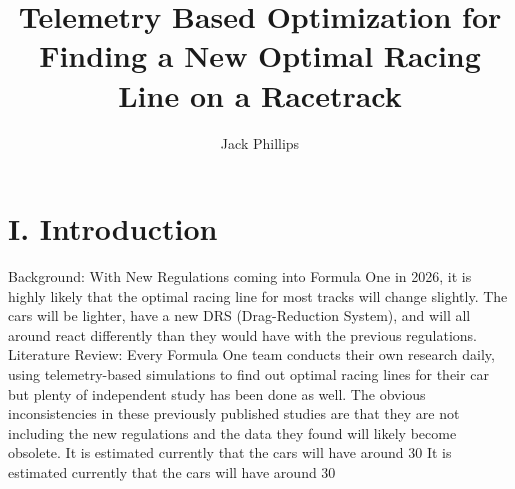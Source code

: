 \documentclass[11pt]{article} %
\title{Telemetry Based Optimization for Finding a New Optimal Racing Line on a Racetrack}
\author{Jack Phillips}
\begin{document}
\maketitle

\section{I.	Introduction}

Background: With New Regulations coming into Formula One in 2026, it is highly likely that the optimal racing line for most tracks will change slightly. The cars will be lighter, have a new DRS (Drag-Reduction System), and will all around react differently than they would have with the previous regulations. 
Literature Review: Every Formula One team conducts their own research daily, using telemetry-based simulations to find out optimal racing lines for their car but plenty of independent study has been done as well. The obvious inconsistencies in these previously published studies are that they are not including the new regulations and the data they found will likely become obsolete. It is estimated currently that the cars will have around 30%
It is estimated currently that the cars will have around 30%
\end{document}
